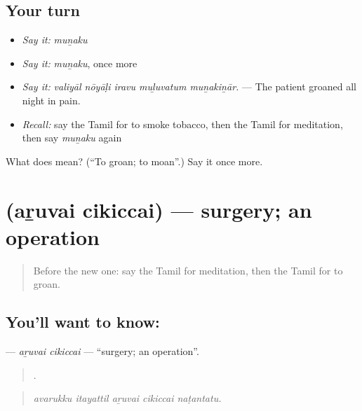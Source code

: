 \subsection*{Your turn}
\begin{itemize}
\raggedright
  \item \emph{Say it:} \emph{muṉaku}
  \item \emph{Say it:} \emph{muṉaku}, once more
  \item \emph{Say it:} \emph{valiyāl nōyāḷi iravu muḻuvatum muṉakiṉār.} — The patient groaned all night in pain.
  \item \emph{Recall:} say the Tamil for to smoke tobacco, then the Tamil for meditation, then say \emph{muṉaku} again
\end{itemize}

\begin{tcolorbox}[breakable,colback=teal!4,colframe=teal!35!black,title={Before you move on}]
What does  mean? (\textquotedblleft{}To groan; to moan\textquotedblright{}.) Say it once more.
\end{tcolorbox}
\section[\texorpdfstring{\ta{அறுவை} \ta{சிகிச்சை} (aṟuvai cikiccai)}{அறுவை சிகிச்சை (aṟuvai cikiccai)}]{  (aṟuvai cikiccai) — surgery; an operation}

\label{lesson:TA-C491-aruvai-cikiccai}



\begin{quote}
Before the new one: say the Tamil for meditation, then the Tamil for to groan.
\end{quote}

\subsection*{You'll want to know:  }
\textbf{ } — \emph{aṟuvai cikiccai} — \textquotedblleft{}surgery; an operation\textquotedblright{}.

\begin{quote}
    .
\end{quote}

\begin{quote}
\emph{avarukku itayattil aṟuvai cikiccai naṭantatu.}
\end{quote}

